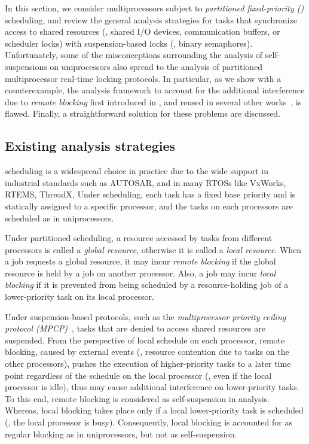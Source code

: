 In this section, we consider multiprocessors subject to \emph{partitioned fixed-priority (\pfp)} scheduling, and review the general analysis strategies for tasks that synchronize access to shared resources (\eg, shared I/O devices, communication buffers, or scheduler locks) with suspension-based locks (\eg, binary semaphores). Unfortunately, some of the misconceptions surrounding the analysis of self-suspensions on uniprocessors also spread to the analysis of partitioned multiprocessor real-time locking protocols. In particular, as we show with a counterexample, the analysis framework to account for the additional interference due to \emph{remote blocking} first introduced in \cite{lakshmanan-2009}, and reused in several other works~\cite{zeng-2011,bbb-2013,yang-2013,kim-2014,han-2014,carminati-2014,yang-2014},  is flawed. Finally, a straightforward solution for these problems are discussed. 

\subsection{Existing analysis strategies}
\label{sec:papers}

\pfp scheduling is a widespread choice in practice due to the wide support in industrial standards such as AUTOSAR, and in many RTOSs like VxWorks, RTEMS, ThreadX, \etc Under \pfp scheduling, each task has a fixed base priority and is statically assigned to a specific processor, and the tasks on each processors are scheduled as in uniprocessors. 

\iffalse
At runtime, a resource-holding job may be assigned a temporarily elevated effective priority according to the employed locking protocol. Thus on each processor, the ready job with highest effective priority is scheduled.\todo{Why are effective priorities relevant here? Just cut it?} 
\fi

Under partitioned scheduling, a resource accessed by tasks from different processors is called a \emph{global resource}, otherwise it is called a \emph{local resource}. When a job requests a global resource, it may incur \emph{remote blocking} if the global resource is held by a job on another processor. Also, a job may incur \emph{local blocking} if it is prevented from being scheduled by a resource-holding job of a lower-priority task on its local processor. 

Under suspension-based protocols, such as the \emph{multiprocessor priority ceiling protocol (MPCP)}~\cite{rajkumar-1990}, tasks that are denied to access shared resources are suspended. From the perspective of local schedule on each processor, remote blocking, caused by external events (\ie, resource contention due to tasks on the other processors), pushes the execution of higher-priority tasks to a later time point regardless of the schedule on the local processor (\ie, even if the local processor is idle), thus may cause additional interference on lower-priority tasks. To this end, remote blocking is considered as self-suspension in analysis. Whereas, local blocking takes place only if a local lower-priority task is scheduled (\ie, the local processor is busy). Consequently, local blocking is accounted for as regular blocking as in uniprocessors, but not as self-suspension.


